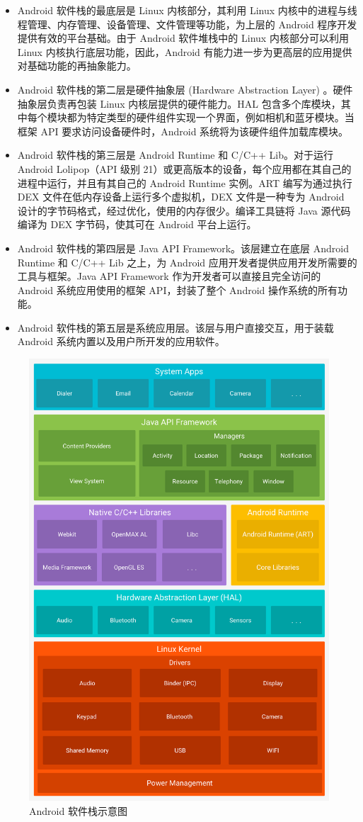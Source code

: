 \begin{itemize}
    \item Android 软件栈的最底层是 Linux 内核部分，其利用 Linux 内核中的进程与线程管理、内存管理、设备管理、文件管理等功能，为上层的 Android 程序开发提供有效的平台基础。由于 Android 软件堆栈中的 Linux 内核部分可以利用 Linux 内核执行底层功能，因此，Android 有能力进一步为更高层的应用提供对基础功能的再抽象能力。
    \item Android 软件栈的第二层是硬件抽象层 (Hardware Abstraction Layer) 。硬件抽象层负责再包装 Linux 内核层提供的硬件能力。HAL 包含多个库模块，其中每个模块都为特定类型的硬件组件实现一个界面，例如相机和蓝牙模块。当框架 API 要求访问设备硬件时，Android 系统将为该硬件组件加载库模块。
    \item Android 软件栈的第三层是 Android Runtime 和 C/C++ Lib。对于运行 Android Lolipop（API 级别 21）或更高版本的设备，每个应用都在其自己的进程中运行，并且有其自己的 Android Runtime 实例。ART 编写为通过执行 DEX 文件在低内存设备上运行多个虚拟机，DEX 文件是一种专为 Android 设计的字节码格式，经过优化，使用的内存很少。编译工具链将 Java 源代码编译为 DEX 字节码，使其可在 Android 平台上运行。
    \item Android 软件栈的第四层是 Java API Framework。该层建立在底层 Android Runtime 和 C/C++ Lib 之上，为 Android 应用开发者提供应用开发所需要的工具与框架。Java API Framework 作为开发者可以直接且完全访问的 Android 系统应用使用的框架 API，封装了整个 Android 操作系统的所有功能。
    \item Android 软件栈的第五层是系统应用层。该层与用户直接交互，用于装载 Android 系统内置以及用户所开发的应用软件。
\end{itemize}

\begin{figure}
    \centering
    \includegraphics[width=.5\textwidth]{figures/android-stack_2x.png}
    \caption{Android 软件栈示意图}
    \label{fig:android-stack}
\end{figure}

